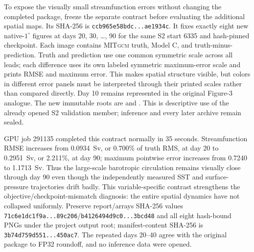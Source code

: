 \documentclass[11pt]{article}
\newcommand{\MITgcm}{\textsc{MITgcm}}
\begin{document}
To expose the visually small streamfunction errors without changing the completed
package, freeze the separate contract
 before evaluating the
additional spatial maps.  Its SHA-256 is
\texttt{ccb965e58bdc...ae1934c}.
It fixes exactly eight new native-\(1^\circ\) figures at days 20, 30, \ldots, 90
for the same S2 start 6335 and hash-pinned checkpoint.  Each image contains
\MITgcm{} truth, Model C, and truth-minus-prediction.  Truth and prediction use one
common symmetric scale across all leads; each difference uses its own labeled
symmetric maximum-error scale and prints RMSE and maximum error.  This makes spatial
structure visible, but colors in different error panels must be interpreted through
their printed scales rather than compared directly.  Day 10 remains represented in
the original Figure-3 analogue.  The new immutable roots are
and .  This is descriptive
use of the already opened S2 validation member; inference and every later archive
remain sealed.

GPU job 291135 completed this contract normally in 35 seconds.  Streamfunction RMSE
increases from 0.0934~Sv, or 0.700\% of truth RMS, at day 20 to 0.2951~Sv, or
2.211\%, at day 90; maximum pointwise error increases from 0.7240 to 1.1713~Sv.
Thus the large-scale barotropic circulation remains visually close through day 90
even though the independently measured SST and surface-pressure trajectories drift
badly.  This variable-specific contrast strengthens the objective/checkpoint-mismatch
diagnosis: the entire spatial dynamics have not collapsed uniformly.  Preserve
report/arrays SHA-256 values
\texttt{71c6e1dc1f9a...89c206}/\texttt{b4126494d9c0...3bcd48} and all eight
hash-bound PNGs under the project output root; manifest-content SHA-256 is
\texttt{3b74d759d551...450ac7}.  The repeated days 20--40 agree with the original
package to FP32 roundoff, and no inference data were opened.
\end{document}
